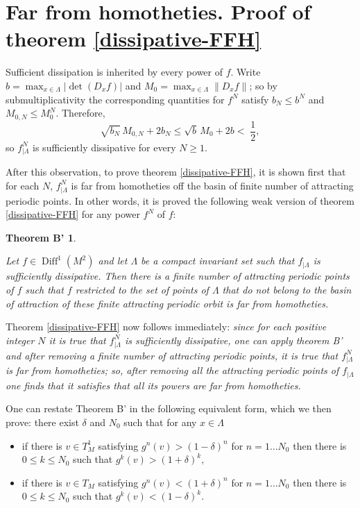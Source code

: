 \documentclass[a4paper,11pt]{article}
\newtheorem*{thmB}{Theorem B'}
\theoremstyle{definition}
\def\La{\Lambda}
\def\de{\delta}
\def\La{\Lambda}
\def\diff{\operatorname{Diff}}
\begin{document}
\section{Far from homotheties. Proof of theorem \ref{dissipative-FFH}}
\label{sec:dissipative}

Sufficient dissipation is inherited by every power of $f$. Write
$b=\max_{x\in\La}|\det(D_xf)|$ and $M_0=\max_{x\in\La}\|D_xf\|$; so by
submultiplicativity the corresponding quantities for $f^{N}$ satisfy $b_N\leq  b^{N}$ and    $M_{0,N}\leq M_0^{N}$. Therefore, 
$$
\sqrt{b_N}\,M_{0,N}+2b_N
\leq \sqrt b\,M_0+2b<\;\frac{1}{2},
$$
so $f^{N}_{|\La}$ is sufficiently dissipative for every $N\geq 1$.


After this observation, to prove theorem \ref{dissipative-FFH}, it is shown first that for each $N$, $f^N_{|\La}$ is far from homotheties off the basin of finite number of attracting periodic points.   In other words, it is proved  the following weak  version of 
theorem \ref{dissipative-FFH} for any power  $f^N$ of $f$:

\begin{thmB}\label{dissipative-FFH2}

Let $f\in \diff^1(M^2)$ and let $\La$ be a compact invariant set such that
$f_{|\La}$ is sufficiently dissipative. Then  there is a finite number of attracting periodic points of  $f$ such that $f$ restricted to the set of
points of $\La$ that do not belong to the basin of attraction of these finite
attracting periodic orbit is far from homotheties. 
\end{thmB}


Theorem \ref{dissipative-FFH} now follows immediately: {\it since  for each positive integer $N$ it is true that $f^N_{|\La}$ is sufficiently dissipative, one can apply theorem B' and after removing a finite number of attracting periodic points, it is true that $f^N_{|\La}$ is far from homotheties; so, after removing all the attracting periodic points of $f_{|\La}$ one finds that it satisfies that all its powers are far from homotheties.}





One can restate Theorem B' in the following equivalent form, which we then prove: there exist $\de$ and $N_0$ such that for any $x\in \La$ 
\begin{itemize}
    \item[--] if there is $v\in T^1_M$ satisfying   $g^n(v)>(1-\de)^n$ for $n=1\dots N_0$ then there is $0\leq k\leq N_0$ such that $g^k(v)>(1+\de)^k,$ 

    \item[--] if there is $v\in T_M$ satisfying   $g^n(v)<(1+\de)^n$ for $n=1\dots N_0$ then there is $0\leq k\leq N_0$ such that $g^k(v)<(1-\de)^k.$ 
\end{itemize}
\end{document}

